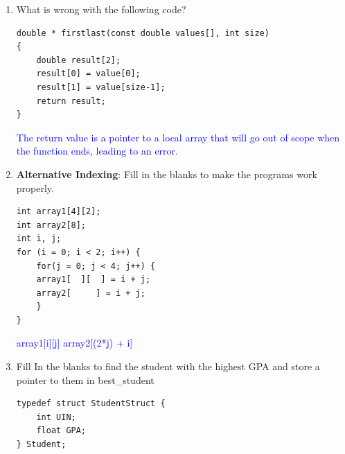 \documentclass{article}
\begin{document}
\begin{enumerate}[label=(\alph*)]
\begin{lstlisting}[style=CStyle] 
void ReverseArray(int array[], int size) {
    int start = 0;
    int end = size - 1;
    int temp;
    
    if (start < end) {
        // Swap First and Last
        temp = array[start];
        array[start] = array[end];
        array[end] = temp;
        
        ReverseArray(array, size-1);
    }
}
int main(){
    int array[5], i;
    for (i = 0; i<5; i++){
        array[i] = i;
    }
    ReverseArray(array, 5);
    printf("Reversed Array: ");

    for (i = 0; i<5; i++){
        printf("%d ", array[i]);
    }
    printf("\n");
    return 0;
}\end{lstlisting}

\textcolor{blue}{The program is basically just flipping the first and last elements, and then flipping the first and second to last and so on. So in the end, the only thing that actually changes is the first element goes to the front and the rest is shifted up. To fix this we need to change the recursive call to ReverseArray(array+1, size-2)}

\item \textbf{}What is wrong with the following code? 
\begin{lstlisting}[style=CStyle] 
double * firstlast(const double values[], int size)
{
    double result[2];
    result[0] = value[0];
    result[1] = value[size-1];
    return result;
}
\end{lstlisting}
\textcolor{blue}{The return value is a pointer to a local array that will go out of scope when the function ends, leading to an error.}

\item \textbf{Alternative Indexing}: Fill in the blanks to make the programs work properly.
\begin{lstlisting}[style=CStyle] 
int array1[4][2];
int array2[8];
int i, j;
for (i = 0; i < 2; i++) {
    for(j = 0; j < 4; j++) {
    array1[  ][  ] = i + j;
    array2[     ] = i + j;
    }
}
\end{lstlisting}
\textcolor{blue}{array1[i][j] \newline array2[(2*j) + i]}
\item Fill In the blanks to find the student with the highest GPA and store a pointer to them in best\_student
\begin{lstlisting}[style=CStyle] 
typedef struct StudentStruct {
    int UIN;
    float GPA;
} Student;


\end{lstlisting}
\end{enumerate}
\end{document}
